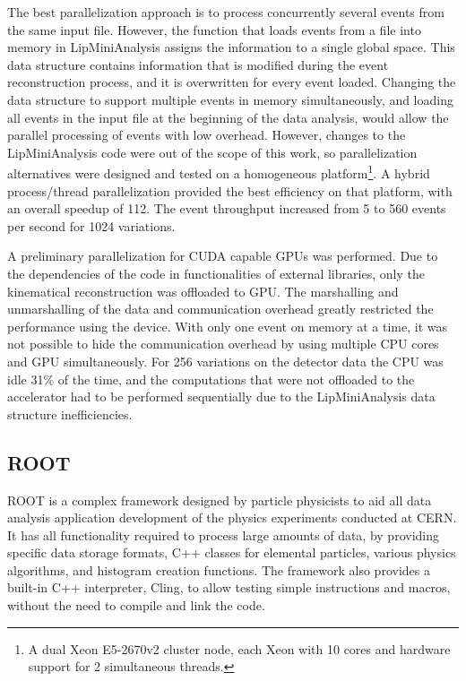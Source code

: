 The best parallelization approach is to process concurrently several events from the same input file. However, the function that loads events from a file into memory in LipMiniAnalysis assigns the information to a single global space. This data structure contains information that is modified during the event reconstruction process, and it is overwritten for every event loaded. Changing the data structure to support multiple events in memory simultaneously, and loading all events in the input file at the beginning of the data analysis, would allow the parallel processing of events with low overhead. However, changes to the LipMiniAnalysis code were out of the scope of this work, so parallelization alternatives were designed and tested on a homogeneous platform\footnote{A dual \intel Xeon E5-2670v2 cluster node, each Xeon with 10 cores and hardware support for 2 simultaneous threads.}. A hybrid process/thread parallelization provided the best efficiency on that platform, with an overall speedup of 112. The event throughput increased from 5 to 560 events per second for 1024 variations.

A preliminary parallelization for CUDA capable GPUs was performed. Due to the dependencies of the code in functionalities of external libraries, only the kinematical reconstruction was offloaded to GPU. The marshalling and unmarshalling of the data and communication overhead greatly restricted the performance using the device. With only one event on memory at a time, it was not possible to hide the communication overhead by using multiple CPU cores and GPU simultaneously. For 256 variations on the detector data the CPU was idle 31\% of the time, and the computations that were not offloaded to the accelerator had to be performed sequentially due to the LipMiniAnalysis data structure inefficiencies.

\subsection*{ROOT}

ROOT \cite{CERN:ROOT} is a complex framework designed by particle physicists to aid all data analysis application development of the physics experiments conducted at CERN. It has all functionality required to process large amounts of data, by providing specific data storage formats, C++ classes for elemental particles, various physics algorithms, and histogram creation functions. The framework also provides a built-in C++ interpreter, Cling, to allow testing simple instructions and macros, without the need to compile and link the code.

